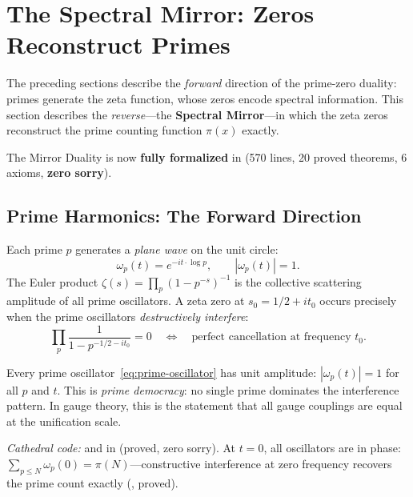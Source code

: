 \section{The Spectral Mirror: Zeros Reconstruct Primes}
\label{sec:spectral-mirror}

The preceding sections describe the \emph{forward} direction of the
prime-zero duality: primes generate the zeta function, whose zeros
encode spectral information. This section describes the
\emph{reverse}---the \textbf{Spectral Mirror}---in which the zeta
zeros reconstruct the prime counting function $\pi(x)$ exactly.

The Mirror Duality is now \textbf{fully formalized} in
 (570 lines, 20 proved
theorems, 6 axioms, \textbf{zero sorry}).

\subsection{Prime Harmonics: The Forward Direction}

Each prime $p$ generates a \emph{plane wave} on the unit circle:
\begin{equation}
  \omega_p(t) = e^{-it \cdot \log p}, \qquad |\omega_p(t)| = 1.
  \label{eq:prime-oscillator}
\end{equation}
The Euler product $\zeta(s) = \prod_p (1 - p^{-s})^{-1}$ is the
collective scattering amplitude of all prime oscillators. A zeta zero
at $s_0 = 1/2 + it_0$ occurs precisely when the prime oscillators
\emph{destructively interfere}:
\begin{equation}
  \prod_p \frac{1}{1 - p^{-1/2 - it_0}} = 0
  \quad \Longleftrightarrow \quad
  \text{perfect cancellation at frequency } t_0.
  \label{eq:destructive-interference}
\end{equation}

\begin{correspondence}
\label{corr:prime-democracy}
Every prime oscillator~\eqref{eq:prime-oscillator} has unit amplitude:
$|\omega_p(t)| = 1$ for all $p$ and $t$. This is \emph{prime democracy}:
no single prime dominates the interference pattern. In gauge theory,
this is the statement that all gauge couplings are equal at the
unification scale.

\emph{Cathedral code:}  and
 in  (proved, zero sorry).
At $t = 0$, all oscillators are in phase:
$\sum_{p \leq N} \omega_p(0) = \pi(N)$---constructive interference
at zero frequency recovers the prime count exactly
(, proved).
\end{correspondence}

